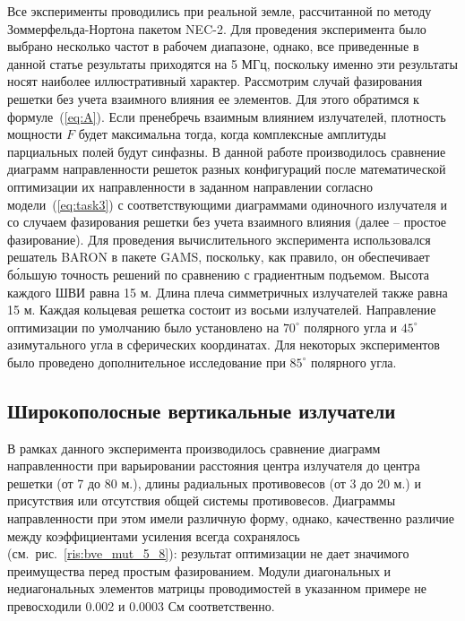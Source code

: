 Все эксперименты проводились при реальной земле, рассчитанной по методу Зоммерфельда-Нортона пакетом NEC-2. Для проведения эксперимента было выбрано несколько частот в рабочем диапазоне, однако, все приведенные в данной статье результаты приходятся на 5 МГц, поскольку именно эти результаты носят наиболее иллюстративный характер.
Рассмотрим случай фазирования решетки без учета взаимного влияния ее элементов. Для этого обратимся к формуле~(\ref{eq:A}). Если пренебречь взаимным влиянием излучателей, плотность мощности $F$ будет максимальна тогда, когда комплексные амплитуды парциальных полей будут синфазны. В данной работе производилось сравнение диаграмм направленности решеток разных конфигураций после математической оптимизации их направленности в заданном направлении согласно модели~(\ref{eq:task3}) с соответствующими диаграммами одиночного излучателя и со случаем фазирования решетки без учета взаимного влияния (далее – простое фазирование).
Для проведения вычислительного эксперимента использовался решатель BARON в пакете GAMS, поскольку, как правило, он обеспечивает бо́льшую точность решений по сравнению с градиентным подъемом. Высота каждого ШВИ равна 15 м. Длина плеча симметричных излучателей также равна 15 м.
Каждая кольцевая решетка состоит из восьми излучателей. Направление оптимизации по умолчанию было установлено на $70^{\circ}$ полярного угла и $45^\circ$ азимутального угла в сферических координатах. Для некоторых экспериментов было проведено дополнительное исследование при $85^\circ$ полярного угла.


\subsection{Широкополосные вертикальные излучатели}
В рамках данного эксперимента производилось сравнение диаграмм направленности при варьировании расстояния центра излучателя до центра решетки (от 7 до 80 м.), длины радиальных противовесов (от 3 до 20 м.) и присутствия или отсутствия общей системы противовесов. Диаграммы направленности при этом имели различную форму, однако, качественно различие между коэффициентами усиления всегда сохранялось (см.~рис.~\ref{ris:bve_mut_5_8}): результат оптимизации не дает значимого преимущества перед простым фазированием.  Модули диагональных и недиагональных элементов матрицы проводимостей в указанном примере не превосходили 0.002 и 0.0003 См соответственно.

